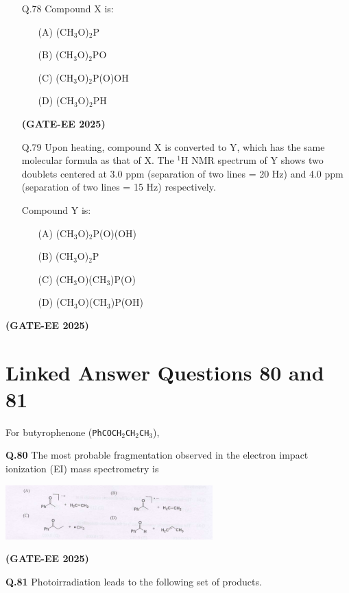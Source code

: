 \documentclass[12pt]{article}
\begin{document}
\begin{enumerate}
\begin{itemize}
    \item[Q.78] Compound X is:
    \begin{enumerate}
        \item[(A)] (CH$_3$O)$_2$P
        \item[(B)] (CH$_3$O)$_2$PO
        \item[(C)] (CH$_3$O)$_2$P(O)OH
        \item[(D)] (CH$_3$O)$_2$PH
    \end{enumerate}   \textbf{(GATE-EE 2025)}


    \item[Q.79] Upon heating, compound X is converted to Y, which has the same molecular formula as that of X. The $^1$H NMR spectrum of Y shows two doublets centered at 3.0 ppm (separation of two lines = 20 Hz) and 4.0 ppm (separation of two lines = 15 Hz) respectively.

    Compound Y is:
    \begin{enumerate}
        \item[(A)] (CH$_3$O)$_2$P(O)(OH)
        \item[(B)] (CH$_3$O)$_2$P
        \item[(C)] (CH$_3$O)(CH$_3$)P(O)
        \item[(D)] (CH$_3$O)(CH$_3$)P(OH)
    \end{enumerate}
\end{itemize}   \textbf{(GATE-EE 2025)}


\section*{Linked Answer Questions 80 and 81}

For butyrophenone (\texttt{PhCOCH\(_2\)CH\(_2\)CH\(_3\)}),

\textbf{Q.80} \quad The most probable fragmentation observed in the electron impact ionization (EI) mass spectrometry is

\begin{center}
\includegraphics[width=0.6\textwidth]{q80.png}
\end{center}   \textbf{(GATE-EE 2025)}


\textbf{Q.81} \quad Photoirradiation leads to the following set of products.


\end{enumerate}
\end{document}
